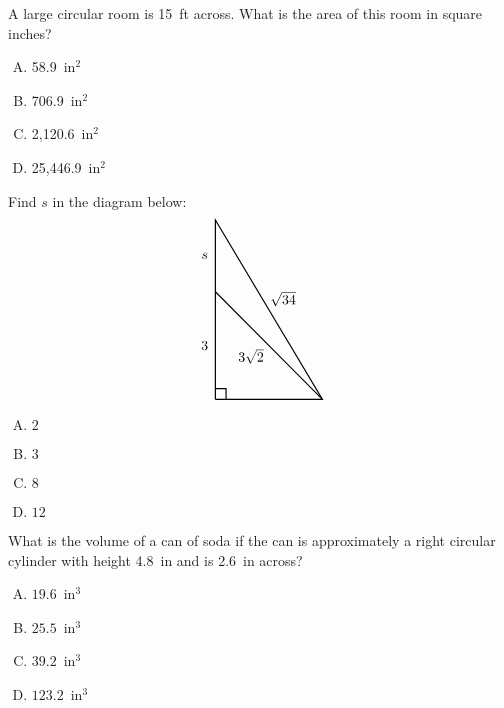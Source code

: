 \documentclass[12pt,letterpaper]{exam}
\begin{document}
\begin{questions}
\vfill



\question A large circular room is 15~ft across. What is the area of this room in square inches?
        \begin{enumerate}[A.]
        \item 58.9~in$^2$ 
        \item 706.9~in$^2$
        \item 2,120.6~in$^2$
        \item 25,446.9~in$^2$
        \end{enumerate}



\vfill



\question Find $s$ in the diagram below:
	\[
	\begin{tikzpicture}[scale=0.9]
	\draw[line width=0.03cm] (0,0) -- (0,5) -- (3,0) -- (0,0);
	\draw[line width=0.03cm] (0,0.3) -- (0.3,0.3) -- (0.3,0);
	\draw[line width=0.03cm] (3,0) -- (0,3);
	\node at (-0.3,1.5) {$3$};
	\node at (1.9,2.8) {$\sqrt{34}$};
	\node at (1,1.2) {$3\sqrt{2}$};
	\node at (-0.3,4.0) {$s$};
	\end{tikzpicture}
	\]

\begin{enumerate}[A.]
\item $2$
\item $3$
\item $8$ 
\item $12$
\end{enumerate}



\vfill



\question What is the volume of a can of soda if the can is approximately a right circular cylinder with height 4.8~in and is 2.6~in across?
        \begin{enumerate}[A.]
        \item $19.6$~in$^3$
        \item $25.5$~in$^3$ 
        \item $39.2$~in$^3$
        \item $123.2$~in$^3$
        \end{enumerate}



\newpage




\end{questions}
\end{document}
